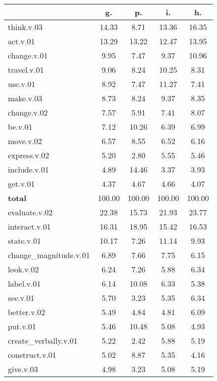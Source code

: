 \begin{table}[h!]
\begin{center}
\begin{tabular}{| l || c | c | c | c |}\hline
 & {\bf g.} & {\bf p.} & {\bf i.} & {\bf h.} \\\hline\hline
think.v.03 & 14.33  & 8.71  & 13.36  & 16.35 \\\hline
act.v.01 & 13.29  & 13.22  & 12.47  & 13.95 \\\hline
change.v.01 & 9.95  & 7.47  & 9.37  & 10.96 \\\hline
travel.v.01 & 9.06  & 8.24  & 10.25  & 8.31 \\\hline
use.v.01 & 8.92  & 7.47  & 11.27  & 7.41 \\\hline
make.v.03 & 8.73  & 8.24  & 9.37  & 8.35 \\\hline
change.v.02 & 7.57  & 5.91  & 7.41  & 8.07 \\\hline
be.v.01 & 7.12  & 10.26  & 6.39  & 6.99 \\\hline
move.v.02 & 6.57  & 8.55  & 6.52  & 6.16 \\\hline
express.v.02 & 5.20  & 2.80  & 5.55  & 5.46 \\\hline
include.v.01 & 4.89  & 14.46  & 3.37  & 3.93 \\\hline
get.v.01 & 4.37  & 4.67  & 4.66  & 4.07 \\\hline\hline
{{\bf total}} & 100.00  & 100.00  & 100.00  & 100.00 \\\hline\hline\hline
evaluate.v.02 & 22.38  & 15.73  & 21.93  & 23.77 \\\hline
interact.v.01 & 16.31  & 18.95  & 15.42  & 16.53 \\\hline
state.v.01 & 10.17  & 7.26  & 11.14  & 9.93 \\\hline
change\_magnitude.v.01 & 6.89  & 7.66  & 7.75  & 6.15 \\\hline
look.v.02 & 6.24  & 7.26  & 5.88  & 6.34 \\\hline
label.v.01 & 6.14  & 10.08  & 6.33  & 5.38 \\\hline
see.v.01 & 5.70  & 3.23  & 5.35  & 6.34 \\\hline
better.v.02 & 5.49  & 4.84  & 4.81  & 6.09 \\\hline
put.v.01 & 5.46  & 10.48  & 5.08  & 4.93 \\\hline
create\_verbally.v.01 & 5.22  & 2.42  & 5.88  & 5.19 \\\hline
construct.v.01 & 5.02  & 8.87  & 5.35  & 4.16 \\\hline
give.v.03 & 4.98  & 3.23  & 5.08  & 5.19 \\\hline\hline

\end{tabular}
\end{center}
\end{table}
